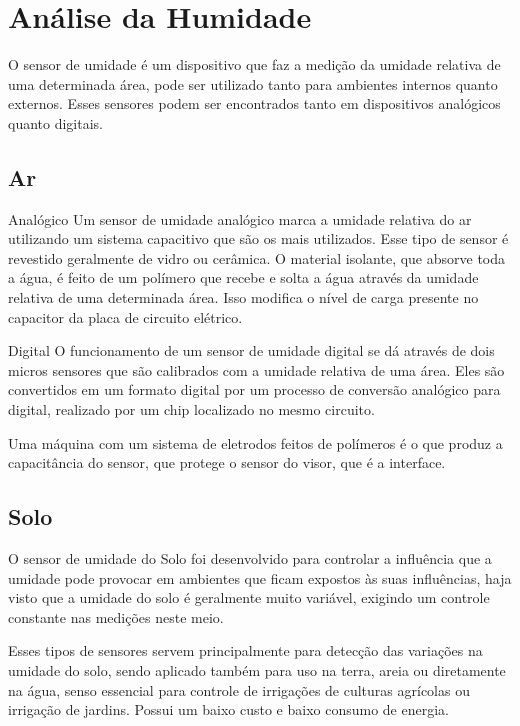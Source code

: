 \section{Análise da Humidade}
O sensor de umidade é um dispositivo que faz a medição da umidade relativa de uma determinada área, pode ser utilizado tanto para ambientes internos quanto externos. Esses sensores podem ser encontrados tanto em dispositivos analógicos quanto digitais.

\subsection{Ar}

Analógico 
Um sensor de umidade analógico marca a umidade relativa do ar utilizando um sistema capacitivo que são os mais utilizados. Esse tipo de sensor é revestido geralmente de vidro ou cerâmica. O material isolante, que absorve toda a água, é feito de um polímero que recebe e solta a água através da umidade relativa de uma determinada área. Isso modifica o nível de carga presente no capacitor da placa de circuito elétrico.

Digital
O funcionamento de um sensor de umidade digital se dá através de dois micros sensores que são calibrados com a umidade relativa de uma área. Eles são convertidos em um formato digital por um processo de conversão analógico para digital, realizado por um chip localizado no mesmo circuito. 

Uma máquina com um sistema de eletrodos feitos de polímeros é o que produz a capacitância do sensor, que protege o sensor do visor,  que é a interface.

\subsection{Solo}

O sensor de umidade do Solo foi desenvolvido para controlar a influência que a umidade pode provocar em ambientes que ficam expostos às suas influências, haja visto que a umidade do solo é geralmente muito variável, exigindo um controle constante nas medições neste meio.

Esses tipos de sensores servem principalmente para detecção das variações na umidade do solo, sendo aplicado também para uso na terra, areia ou diretamente na água,  senso essencial para controle de irrigações de culturas agrícolas ou irrigação de jardins. Possui um baixo custo e baixo consumo de energia.